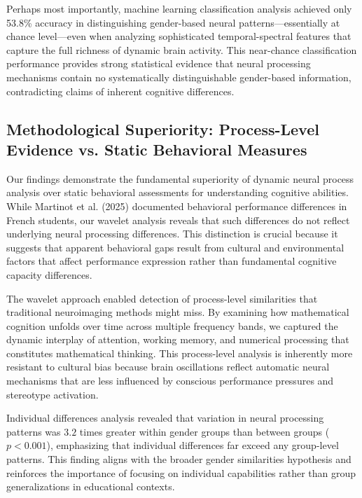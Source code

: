 \documentclass[pdflatex,sn-nature]{sn-jnl}%
\theoremstyle{thmstyleone}%
\theoremstyle{thmstyletwo}%
\theoremstyle{thmstylethree}%
\begin{document}
Perhaps most importantly, machine learning classification analysis achieved only 53.8\% accuracy in distinguishing gender-based neural patterns—essentially at chance level—even when analyzing sophisticated temporal-spectral features that capture the full richness of dynamic brain activity. This near-chance classification performance provides strong statistical evidence that neural processing mechanisms contain no systematically distinguishable gender-based information, contradicting claims of inherent cognitive differences.


\subsection{Methodological Superiority: Process-Level Evidence vs. Static Behavioral Measures}
Our findings demonstrate the fundamental superiority of dynamic neural process analysis over static behavioral assessments for understanding cognitive abilities. While Martinot et al. (2025)\cite{martinot2025mathematical} documented behavioral performance differences in French students, our wavelet analysis reveals that such differences do not reflect underlying neural processing differences. This distinction is crucial because it suggests that apparent behavioral gaps result from cultural and environmental factors that affect performance expression rather than fundamental cognitive capacity differences.

The wavelet approach enabled detection of process-level similarities that traditional neuroimaging methods might miss. By examining how mathematical cognition unfolds over time across multiple frequency bands, we captured the dynamic interplay of attention, working memory, and numerical processing that constitutes mathematical thinking\cite{arsalidou2011brain,nieder2016neural}. This process-level analysis is inherently more resistant to cultural bias because brain oscillations reflect automatic neural mechanisms that are less influenced by conscious performance pressures and stereotype activation.

Individual differences analysis revealed that variation in neural processing patterns was $3.2$ times greater within gender groups than between groups ($p < 0.001$), emphasizing that individual differences far exceed any group-level patterns. This finding aligns with the broader gender similarities hypothesis\cite{hyde2005gender} and reinforces the importance of focusing on individual capabilities rather than group generalizations in educational contexts.
\end{document}
